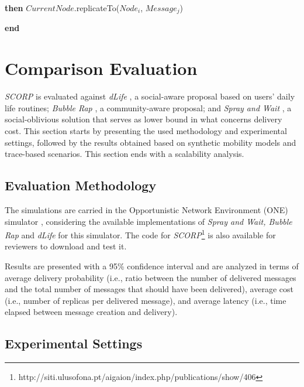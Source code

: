 \documentclass[lnicst]{svmultln}
\begin{document}
\begin{algorithm}
{\footnotesize \hspace{0.9 cm}}\textbf{\footnotesize then}{\footnotesize{}
$CurrentNode$.replicateTo(}\emph{\footnotesize $Node_{i}$}{\footnotesize ,
$Message_{j}$)}\textbf{\footnotesize \vspace{-0.03 cm}}{\footnotesize \par}

\textbf{\footnotesize end}
\end{algorithm}




\section{Comparison Evaluation\label{sec:Comparison-Evaluation} }

\emph{SCORP} is evaluated against \emph{dLife} \cite{dlife,draftDlife},
a social-aware proposal based on users' daily life routines; \emph{Bubble
Rap} \cite{bubble2011}, a community-aware proposal; and \emph{Spray
and Wait} \cite{spraywait}, a social-oblivious solution that serves
as lower bound in what concerns delivery cost. This section starts
by presenting the used methodology and experimental settings, followed
by the results obtained based on synthetic mobility models and trace-based
scenarios. This section ends with a scalability analysis.


\subsection{Evaluation Methodology\label{sub:Evaluation-Methodology}}

The simulations are carried in the Opportunistic Network Environment
(ONE) simulator \cite{one}, considering the available implementations
of \emph{Spray and Wait, Bubble Rap }and\emph{ dLife }for this simulator. The code for \emph{SCORP}\footnote{http://siti.ulusofona.pt/aigaion/index.php/publications/show/406} is also available for reviewers to download and test it.

Results are presented with a 95\% confidence interval and are analyzed
in terms of average delivery probability (i.e., ratio between the
number of delivered messages and the total number of messages that
should have been delivered), average cost (i.e., number of replicas
per delivered message), and average latency (i.e., time elapsed between
message creation and delivery).


\subsection{Experimental Settings \label{sub:Settings}}
\end{document}
